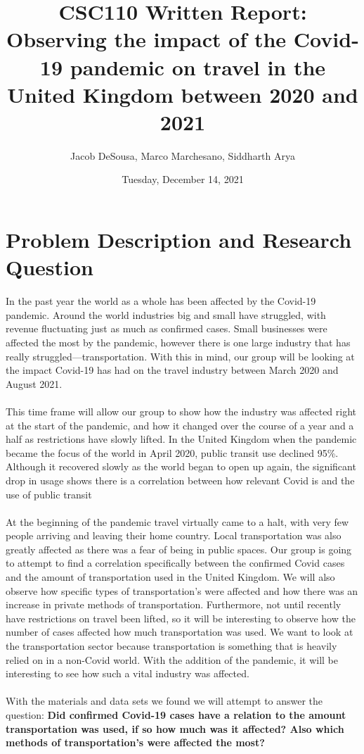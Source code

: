 \documentclass[fontsize=11pt]{article}
\title{CSC110 Written Report: Observing the impact of the Covid-19 pandemic on travel in the United Kingdom between 2020 and 2021}
\author{Jacob DeSousa, Marco Marchesano, Siddharth Arya}
\date{Tuesday, December 14, 2021}
\begin{document}
  
\maketitle  
  
\section*{Problem Description and Research Question}  
  
In the past year the world as a whole has been affected by the Covid-19 pandemic. Around the world industries big and small have struggled, with revenue fluctuating just as much as confirmed cases. Small businesses were affected the most by the pandemic, however there is one large industry that has really struggled—transportation. With this in mind, our group will be looking at the impact Covid-19 has had on the travel industry between March 2020 and August 2021.
\\ \\
This time frame will allow our group to show how the industry was affected right at the start of the pandemic, and how it changed over the course of a year and a half as restrictions have slowly lifted. In the United Kingdom when the pandemic became the focus of the world in April 2020, public transit use declined 95\%. Although it recovered slowly as the world began to open up again, the significant drop in usage shows there is a correlation between how relevant Covid is and the use of public transit
\\ \\
At the beginning of the pandemic travel virtually came to a halt, with very few people arriving and leaving their home country. Local transportation was also greatly affected as there was a fear of being in public spaces. Our group is going to attempt to find a correlation specifically between the confirmed Covid cases and the amount of transportation used in the United Kingdom. We will also observe how specific types of transportation's were affected and how there was an increase in private methods of transportation. Furthermore, not until recently have restrictions on travel been lifted, so it will be interesting to observe how the number of cases affected how much transportation was used. We want to look at the transportation sector because transportation is something that is heavily relied on in a non-Covid world. With the addition of the pandemic, it will be interesting to see how such a vital industry was affected. 
\\ \\
With the materials and data sets we found we will attempt to answer the question: \textbf{Did confirmed Covid-19 cases have a relation to the amount transportation was used, if so how much was it affected? Also which methods of transportation's were affected the most? }
  
\end{document}
